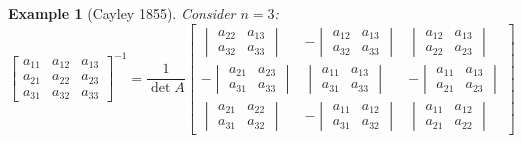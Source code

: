 \documentclass[a4paper,landscape,twocolumn]{article}
\newtheorem{ex}{Example}
\begin{document}
\begin{ex}[Cayley 1855]
  Consider $n=3$:
  \[
    \begin{bmatrix}
      a_{11} & a_{12} & a_{13} \\
      a_{21} & a_{22} & a_{23} \\
      a_{31} & a_{32} & a_{33}
    \end{bmatrix}^{-1}
    = \frac{1}{\det{A}}
    \begin{bmatrix}
      \begin{vmatrix}
        a_{22} & a_{13} \\
        a_{32} & a_{33}
      \end{vmatrix} &
      - \begin{vmatrix}
        a_{12} & a_{13} \\
        a_{32} & a_{33}
      \end{vmatrix} &
      \begin{vmatrix}
        a_{12} & a_{13} \\
        a_{22} & a_{23}
      \end{vmatrix} \\
      - \begin{vmatrix}
        a_{21} & a_{23} \\
        a_{31} & a_{33}
      \end{vmatrix} &
      \begin{vmatrix}
        a_{11} & a_{13} \\
        a_{31} & a_{33}
      \end{vmatrix} &
      -\begin{vmatrix}
        a_{11} & a_{13} \\
        a_{21} & a_{23}
      \end{vmatrix} \\
      \begin{vmatrix}
        a_{21} & a_{22} \\
        a_{31} & a_{32}
      \end{vmatrix} &
      - \begin{vmatrix}
        a_{11} & a_{12} \\
        a_{31} & a_{32}
      \end{vmatrix} &
      \begin{vmatrix}
        a_{11} & a_{12} \\
        a_{21} & a_{22}
      \end{vmatrix}
    \end{bmatrix}
  \]
\end{ex}
\end{document}
